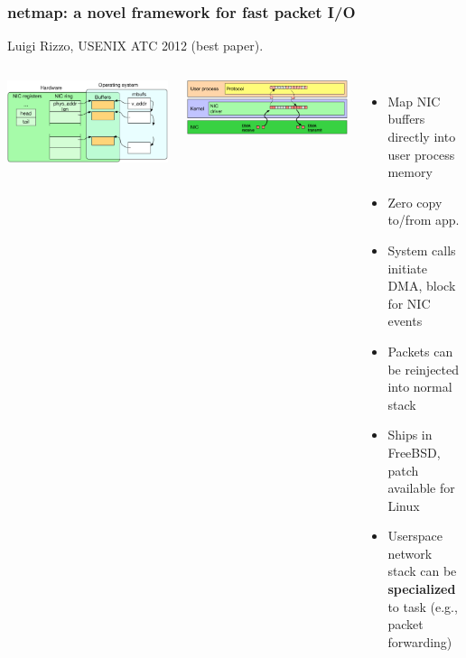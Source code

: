 \begin{frame}
  \frametitle{netmap: a novel framework for fast packet I/O}

  Luigi Rizzo, USENIX ATC 2012 (best paper).

  \begin{columns}[T]

      \smallskip
      \includegraphics[width=1.1\textwidth]{../../figures/network-nic-stack.pdf}

      \bigskip
      \includegraphics[width=1.1\textwidth]{../../figures/network-netmap-memory-flow.pdf}


    \pause

    \begin{itemize}
      \item Map NIC buffers directly into user process memory
      \item Zero copy to/from app.

      \medskip
      \pause

      \item System calls initiate DMA, block for NIC events
      \item Packets can be reinjected into normal stack
      \item Ships in FreeBSD, patch available for Linux

      \medskip
      \pause

      \item Userspace network stack can be \textbf{specialized} to task
	(e.g., packet forwarding)
    \end{itemize}
  \end{columns}
\end{frame}

